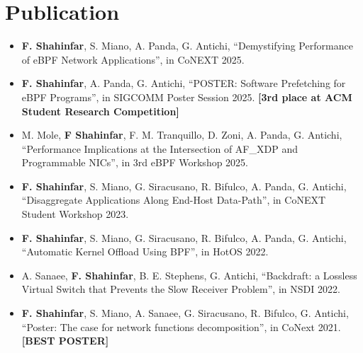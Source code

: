 \section {Publication}
\begin{itemize}
    \small
  \item \textbf{F. Shahinfar}, S. Miano, A. Panda, G. Antichi,
    ``Demystifying Performance of eBPF Network Applications'',
    in CoNEXT 2025.
  \item \textbf{F. Shahinfar}, A. Panda, G. Antichi,
    ``POSTER: Software Prefetching for eBPF Programs'',
    in SIGCOMM Poster Session 2025. \textbf{[3rd place at ACM Student Research Competition]}
  \item M. Mole, \textbf{F Shahinfar}, F. M. Tranquillo, D. Zoni, A. Panda, G. Antichi,
    ``Performance Implications at the Intersection of AF\_XDP and Programmable NICs'',
    in 3rd eBPF Workshop 2025.
  \item \textbf{F. Shahinfar}, S. Miano, G. Siracusano, R. Bifulco, A. Panda, G. Antichi,
    ``Disaggregate Applications Along End-Host Data-Path'',
    in CoNEXT Student Workshop 2023.
  \item \textbf{F. Shahinfar}, S. Miano, G. Siracusano, R. Bifulco, A. Panda, G. Antichi, ``Automatic Kernel Offload Using BPF'', in HotOS 2022.
  \item A. Sanaee, \textbf{F. Shahinfar}, B. E. Stephens, G. Antichi, ``Backdraft: a Lossless Virtual Switch that
    Prevents the Slow Receiver Problem'', in NSDI 2022.
  \item \textbf{F. Shahinfar}, S. Miano, A. Sanaee, G. Siracusano, R. Bifulco, G. Antichi,
    ``Poster: The case for network functions decomposition'', in CoNext 2021. \textbf{[BEST POSTER]}
\end{itemize}

